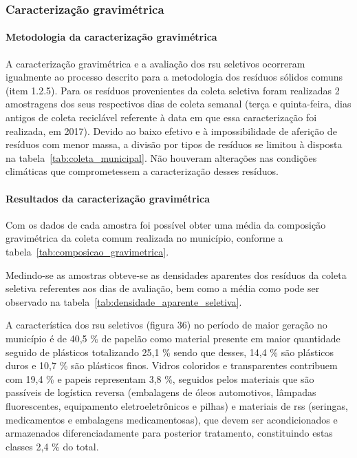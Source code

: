 	\subsubsection{Caracterização gravimétrica}
	
	\paragraph{\textbf{Metodologia da caracterização gravimétrica}}
	
	A caracterização gravimétrica e a avaliação dos \gls{rsu} seletivos ocorreram igualmente ao processo descrito para a metodologia dos resíduos sólidos comuns (item 1.2.5). Para os resíduos provenientes da coleta seletiva foram realizadas 2 amostragens dos seus respectivos dias de coleta semanal (terça e quinta-feira, dias antigos de coleta reciclável referente à data em que essa caracterização foi realizada, em 2017). Devido ao baixo efetivo e à impossibilidade de aferição de resíduos com menor massa, a divisão por tipos de resíduos se limitou à disposta na tabela~\ref{tab:coleta_municipal}. Não houveram alterações nas condições climáticas que comprometessem a caracterização desses resíduos.
	
%	
	
	\paragraph{\textbf{Resultados da caracterização gravimétrica}}
	
	Com os dados de cada amostra foi possível obter uma média da composição gravimétrica da coleta comum realizada no município, conforme a tabela~\ref{tab:composicao_gravimetrica}.
	
%	
	
	Medindo-se as amostras obteve-se as densidades aparentes dos resíduos da coleta seletiva referentes aos dias de avaliação, bem como a média como pode ser observado na tabela~\ref{tab:densidade_aparente_seletiva}.
	
%	
	
	A característica dos \gls{rsu} seletivos (figura 36) no período de maior geração no município é de 40,5 \% de papelão como material presente em maior quantidade seguido de plásticos totalizando 25,1 \% sendo que desses, 14,4 \% são plásticos duros e 10,7 \% são plásticos finos. Vidros coloridos e transparentes contribuem com 19,4 \% e papeis representam 3,8 \%, seguidos pelos materiais que são passíveis de logística reversa (embalagens de óleos automotivos, lâmpadas fluorescentes, equipamento eletroeletrônicos e pilhas) e materiais de \gls{rss} (seringas, medicamentos e embalagens medicamentosas), que devem ser acondicionados e armazenados diferenciadamente para posterior tratamento, constituindo estas classes 2,4 \% do total. 
	
